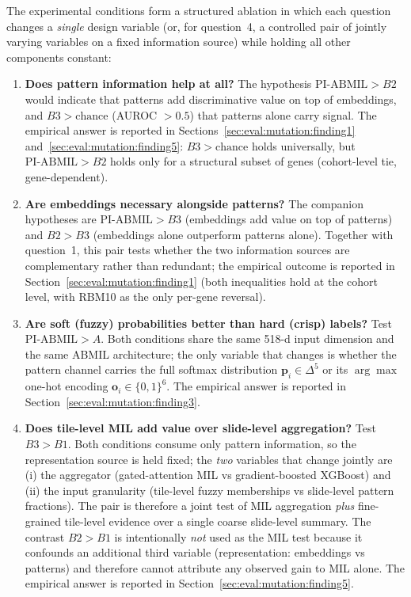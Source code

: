 The experimental conditions form a structured ablation in which each
question changes a \emph{single} design variable (or, for
question~4, a controlled pair of jointly varying variables on a
fixed information source) while holding all other components
constant:
\begin{enumerate}
    \item \textbf{Does pattern information help at all?}
    The hypothesis $\text{PI-ABMIL} > B2$ would indicate that patterns
    add discriminative value on top of embeddings, and $B3 >
    \text{chance}$ (AUROC $> 0.5$) that patterns alone carry
    signal.
    The empirical answer is reported in
    Sections~\ref{sec:eval:mutation:finding1}
    and~\ref{sec:eval:mutation:finding5}: $B3 > \text{chance}$ holds
    universally, but $\text{PI-ABMIL} > B2$ holds only for a
    structural subset of genes (cohort-level tie, gene-dependent).

    \item \textbf{Are embeddings necessary alongside patterns?}
    The companion hypotheses are $\text{PI-ABMIL} > B3$
    (embeddings add value on top of patterns) and $B2 > B3$
    (embeddings alone outperform patterns alone).
    Together with question~1, this pair tests whether the two
    information sources are complementary rather than redundant; the
    empirical outcome is reported in
    Section~\ref{sec:eval:mutation:finding1} (both inequalities hold
    at the cohort level, with RBM10 as the only per-gene reversal).

    \item \textbf{Are soft (fuzzy) probabilities better than hard
    (crisp) labels?}
    Test $\text{PI-ABMIL} > A$.
    Both conditions share the same 518-d input dimension and the same
    ABMIL architecture; the only variable that changes is whether the
    pattern channel carries the full softmax distribution
    $\mathbf{p}_i \in \Delta^5$ or its $\arg\max$ one-hot encoding
    $\mathbf{o}_i \in \{0,1\}^6$.
    The empirical answer is reported in
    Section~\ref{sec:eval:mutation:finding3}.

    \item \textbf{Does tile-level MIL add value over slide-level
    aggregation?}
    Test $B3 > B1$.
    Both conditions consume only pattern information, so the
    representation source is held fixed; the \emph{two} variables
    that change jointly are (i) the aggregator (gated-attention MIL
    vs gradient-boosted XGBoost) and (ii) the input granularity
    (tile-level fuzzy memberships vs slide-level pattern fractions).
    The pair is therefore a joint test of MIL aggregation
    \emph{plus} fine-grained tile-level evidence over a single
    coarse slide-level summary.
    The contrast $B2 > B1$ is intentionally \emph{not} used as the
    MIL test because it confounds an additional third variable
    (representation: embeddings vs patterns) and therefore cannot
    attribute any observed gain to MIL alone.
    The empirical answer is reported in
    Section~\ref{sec:eval:mutation:finding5}.


\end{enumerate}
